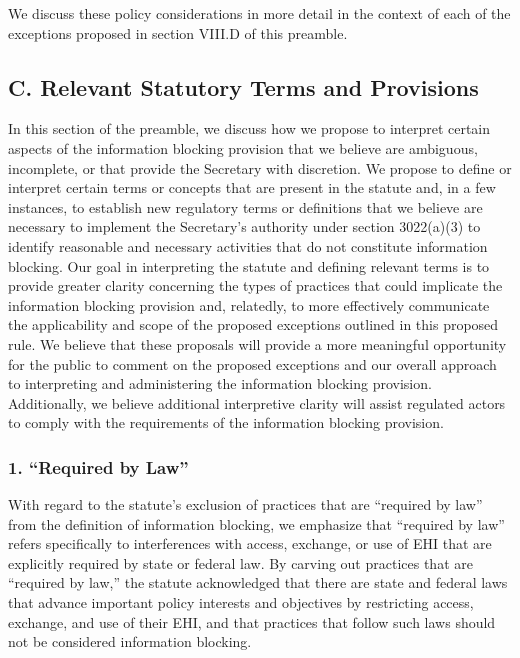 \documentclass[twoside,11pt]{article}
\begin{document}
          We discuss these policy considerations in more detail in the context of each of the exceptions proposed in section VIII.D of this preamble.


          \subsection{C. Relevant Statutory Terms and Provisions}

          In this section of the preamble, we discuss how we propose to interpret certain aspects of the information blocking provision that we believe are ambiguous, incomplete, or that provide the Secretary with discretion. We propose to define or interpret certain terms or concepts that are present in the statute and, in a few instances, to establish new regulatory terms or definitions that we believe are necessary to implement the Secretary's authority under section 3022(a)(3) to identify reasonable and necessary activities that do not constitute information blocking. Our goal in interpreting the statute and defining relevant terms is to provide greater clarity concerning the types of practices that could implicate the information blocking provision and, relatedly, to more effectively communicate the applicability and scope of the proposed exceptions outlined in this proposed rule. We believe that these proposals will provide a more meaningful opportunity for the public to comment on the proposed exceptions and our overall approach to interpreting and administering the information blocking provision. Additionally, we believe additional interpretive clarity will assist regulated actors to comply with the requirements of the information blocking provision.


          \subsubsection{1. “Required by Law”}


          With regard to the statute's exclusion of practices that are “required by law” from the definition of information blocking, we emphasize that “required by law” refers specifically to interferences with access, exchange, or use of EHI that are explicitly required by state or federal law. By carving out practices that are “required by law,” the statute acknowledged that there are state and federal laws that advance important policy interests and objectives by restricting access, exchange, and use of their EHI, and that practices that follow such laws should not be considered information blocking. \ifhmode\expandafter\xspace\fi 
          
\end{document}
